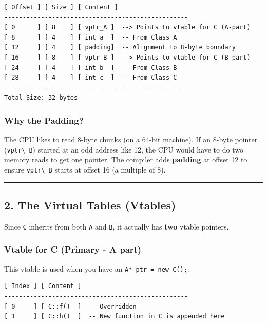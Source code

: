 \begin{lstlisting}
[ Offset ] [ Size ] [ Content ]
--------------------------------------------------
[ 0      ] [ 8    ] [ vptr_A ]  --> Points to vtable for C (A-part)
[ 8      ] [ 4    ] [ int a  ]  -- From Class A
[ 12     ] [ 4    ] [ padding]  -- Alignment to 8-byte boundary
[ 16     ] [ 8    ] [ vptr_B ]  --> Points to vtable for C (B-part)
[ 24     ] [ 4    ] [ int b  ]  -- From Class B
[ 28     ] [ 4    ] [ int c  ]  -- From Class C
--------------------------------------------------
Total Size: 32 bytes
\end{lstlisting}

\hypertarget{why-the-padding}{%
\subsubsection{Why the Padding?}\label{why-the-padding}}

The CPU likes to read 8-byte chunks (on a 64-bit machine). If an 8-byte
pointer (\passthrough{\lstinline!vptr\_B!}) started at an odd address
like 12, the CPU would have to do two memory reads to get one pointer.
The compiler adds \textbf{padding} at offset 12 to ensure
\passthrough{\lstinline!vptr\_B!} starts at offset 16 (a multiple of 8).

\begin{center}\rule{0.5\linewidth}{0.5pt}\end{center}

\hypertarget{the-virtual-tables-vtables}{%
\subsection{2. The Virtual Tables
(Vtables)}\label{the-virtual-tables-vtables}}

Since \passthrough{\lstinline!C!} inherits from both
\passthrough{\lstinline!A!} and \passthrough{\lstinline!B!}, it actually
has \textbf{two} vtable pointers.

\hypertarget{vtable-for-c-primary---a-part}{%
\subsubsection{Vtable for C (Primary - A
part)}\label{vtable-for-c-primary---a-part}}

This vtable is used when you have an
\passthrough{\lstinline!A* ptr = new C();!}.

\begin{lstlisting}
[ Index ] [ Content ]
--------------------------------------------------
[ 0     ] [ C::f()  ]  -- Overridden
[ 1     ] [ C::h()  ]  -- New function in C is appended here
\end{lstlisting}

